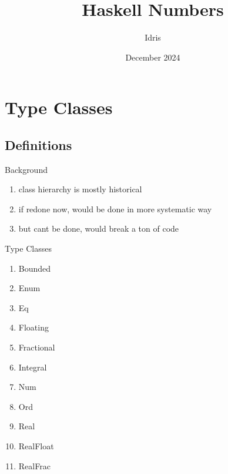 \documentclass[openany, 11pt]{book}
\title{Haskell Numbers}
\author{Idris}
\date{December 2024}
\begin{document}
\tableofcontents


\chapter{Type Classes}
\section{Definitions}
\begin{definition}{Background}{}
	\begin{enumerate}[label = {(\arabic*)}]
		\item class hierarchy is mostly historical
		\item if redone now, would be done in more systematic way
		\item but cant be done, would break a ton of code
	\end{enumerate}
\end{definition}

\begin{definition}{Type Classes}{}
	\begin{multicols}{2}
		\begin{enumerate}[label = {(\arabic*)}]
			\item Bounded
			\item Enum
			\item Eq
			\item Floating
			\item Fractional
			\item Integral
			\item Num
			\item Ord
			\item Real
			\item RealFloat
			\item RealFrac
		\end{enumerate}
	\end{multicols}
\end{definition}
\end{document}
